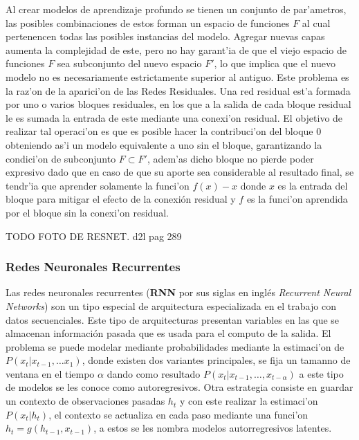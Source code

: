 Al crear modelos de aprendizaje profundo se tienen un conjunto de par'ametros, las posibles combinaciones 
de estos forman un espacio de funciones $F$ al cual pertenencen todas las posibles instancias del modelo.
Agregar nuevas capas aumenta la complejidad de este, pero no hay garant'ia de que el viejo espacio 
de funciones $F$ sea subconjunto del nuevo espacio $F'$, lo que implica que el nuevo modelo no es necesariamente
estrictamente superior al antiguo. Este problema es la raz'on de la aparici'on de las Redes Residuales. 
Una red residual est'a formada por 
uno o varios bloques residuales, en los que a la salida de cada bloque residual le es sumada la entrada de 
este mediante una conexi'on residual.
El objetivo de realizar tal operaci'on es que es posible hacer la contribuci'on del bloque 0 obteniendo as'i
un modelo equivalente a uno sin el bloque, garantizando la condici'on de subconjunto $F \subset F'$, adem'as 
dicho bloque no pierde poder expresivo dado que en caso de que su aporte sea considerable al resultado final, 
se tendr'ia que aprender solamente la funci'on $f(x) - x$ donde $x$ es la entrada del bloque para mitigar el 
efecto de la conexión residual y $f$ es la funci'on aprendida por el bloque sin la conexi'on residual.

TODO FOTO DE RESNET. d2l pag 289

\subsubsection{Redes Neuronales Recurrentes}

Las redes neuronales recurrentes (\textbf{RNN} por sus siglas en inglés \emph{Recurrent Neural Networks}) son
un tipo especial de arquitectura especializada en el trabajo con datos secuenciales. Este tipo de arquitecturas
presentan variables en las que se almacenan información pasada que es usada para el computo de la salida. El 
problema se puede modelar mediante probabilidades mediante la estimaci'on de $P(x_t | x_{t-1}, \dots x_{1})$,
donde existen dos variantes principales, se fija un tamanno de ventana en el tiempo $\alpha$ dando como resultado
$P(x_t | x_{t-1}, \dots, x_{t-\alpha})$ a este tipo de modelos se les conoce como autoregresivos. Otra estrategia
consiste en guardar un contexto de observaciones pasadas $h_t$ y con este realizar la estimaci'on $P(x_t | h_t)$,
el contexto se actualiza en cada paso mediante una funci'on $h_t = g(h_{t-1}, x_{t-1})$, a estos se les nombra
modelos autorregresivos latentes. 

